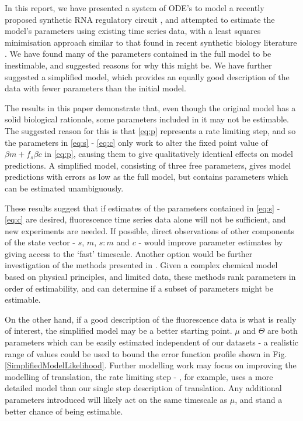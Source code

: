 \documentclass[10pt,journal]{./IEEE_latex_class/IEEEtran}
\begin{document}
In this report, we have presented a system of ODE's to model a recently proposed synthetic RNA regulatory circuit \cite{Rodrigo2012}, and attempted to estimate the model's parameters using existing time series data, with a least squares minimisation approach similar to that found in recent synthetic biology literature \cite{Hu2015}. We have found many of the parameters contained in the full model to be inestimable, and suggested reasons for why this might be. We have further suggested a simplified model, which provides an equally good description of the data with fewer parameters than the initial model.

The results in this paper demonstrate that, even though the original model has a solid biological rationale, some parameters included in it may not be estimable. The suggested reason for this is that \eqref{eq:p} represents a rate limiting step, and so the parameters in \eqref{eq:s} - \eqref{eq:c} only work to alter the fixed point value of $\beta m +f_{s}\beta c$ in \eqref{eq:p}, causing them to give qualitatively identical effects on model predictions. A simplified model, consisting of three free parameters, gives model predictions with errors as low as the full model, but contains parameters which can be estimated unambiguously.

These results suggest that if estimates of the parameters contained in \eqref{eq:s} - \eqref{eq:c} are desired, fluorescence time series data alone will not be sufficient, and new experiments are needed. If possible, direct observations of other components of the state vector - $s$, $m$, $s:m$ and $c$ - would improve parameter estimates by giving access to the `fast' timescale. Another option would be further investigation of the methods presented in \cite{Mclean2012,Yao2003,Mclean2012-2}. Given a complex chemical model based on physical principles, and limited data, these methods rank parameters in order of estimability, and can determine if a subset of parameters might be estimable.

On the other hand, if a good description of the fluorescence data is what is really of interest, the simplified model may be a better starting point. $\mu$ and $\Theta$ are both parameters which can be easily estimated independent of our datasets - a realistic range of values could be used to bound the error function profile shown in Fig. \ref{SimplifiedModelLikelihood}. Further modelling work may focus on improving the modelling of translation, the rate limiting step - \cite{Hu2015}, for example, uses a more detailed model than our single step description of translation. Any additional parameters introduced will likely act on the same timescale as $\mu$, and stand a better chance of being estimable.
\end{document}
